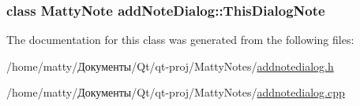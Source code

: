 \subsubsection[{\texorpdfstring{This\+Dialog\+Note}{ThisDialogNote}}]{\setlength{\rightskip}{0pt plus 5cm}class {\bf Matty\+Note} add\+Note\+Dialog\+::\+This\+Dialog\+Note\hspace{0.3cm}{\ttfamily [private]}}\hypertarget{classadd_note_dialog_a3bd8efdf8721f0840894f3f5856c6a2b}{}\label{classadd_note_dialog_a3bd8efdf8721f0840894f3f5856c6a2b}


The documentation for this class was generated from the following files\+:\begin{DoxyCompactItemize}
\item 
/home/matty/Документы/\+Qt/qt-\/proj/\+Matty\+Notes/\hyperlink{addnotedialog_8h}{addnotedialog.\+h}\item 
/home/matty/Документы/\+Qt/qt-\/proj/\+Matty\+Notes/\hyperlink{addnotedialog_8cpp}{addnotedialog.\+cpp}\end{DoxyCompactItemize}
